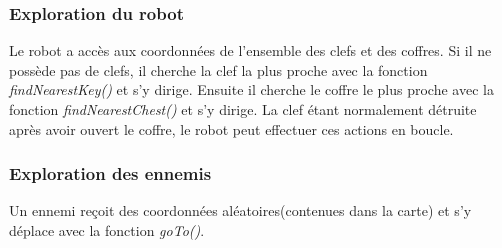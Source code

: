 \documentclass[a4paper 12pts]{article}
\begin{document}
\subsubsection{Exploration du robot}
Le robot a accès aux coordonnées de l'ensemble des clefs et des coffres. Si il ne possède pas de clefs, il cherche la clef la plus proche avec la fonction \emph{findNearestKey()} et s'y dirige.
Ensuite il cherche le coffre le plus proche avec la fonction \emph{findNearestChest()} et s'y dirige.
La clef étant normalement détruite après avoir ouvert le coffre, le robot peut effectuer ces actions en boucle.

\subsubsection{Exploration des ennemis}
Un ennemi reçoit des coordonnées aléatoires(contenues dans la carte) et s'y déplace avec la fonction \emph{goTo()}.
\end{document}
